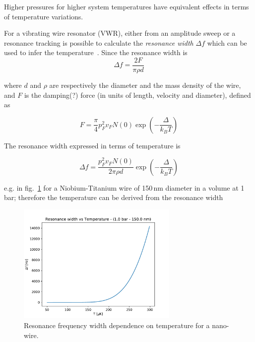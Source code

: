 \documentclass[a4paper,10pt]{article}
\begin{document}
Higher pressures for higher system temperatures have equivalent effects in terms of temperature variations.

For a vibrating wire resonator (VWR), either from an amplitude sweep or a resonance tracking is possible to calculate the \textit{resonance width} $\Delta f$ which can be used to infer the temperature~\cite{lawson}.
Since the resonance width is
\begin{equation}
\Delta f = \frac{2F}{\pi \rho d}
\end{equation}

where $d$ and $\rho$ are respectively the diameter and the mass density of the wire, and $F$ is the damping(?) force (in units of length, velocity and diameter), defined as

\begin{equation}
F = \frac{\pi}{4}p^2_F v_F N(0) \exp{\left( -\frac{\Delta}{k_B T} \right)}
\end{equation}

The resonance width expressed in terms of temperature is

\begin{equation}
\Delta f = \frac{p^2_F v_F N(0)}{2\pi\rho d}\exp{\left( -\frac{\Delta}{k_B T} \right)}
\end{equation}

e.g. in fig.~\ref{fig:WvsT} for a Niobium-Titanium wire of 150\,nm diameter in a volume at 1\,bar; therefore the temperature can be derived from the resonance width

\begin{figure}[!ht]
  \begin{center}
    \includegraphics[width=0.69\textwidth]{W_vs_T}
    \caption{Resonance frequency width dependence on temperature for a nano-wire.}
    \label{fig:WvsT}
  \end{center}
\end{figure}
\end{document}
